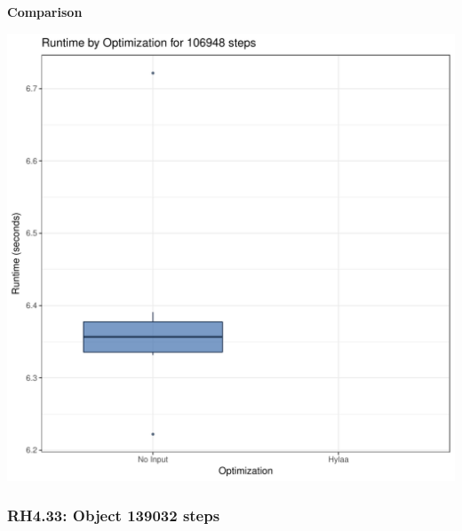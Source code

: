 \documentclass{article}\usepackage[]{graphicx}\usepackage[]{color}
\makeatletter
\def\maxwidth{ %
  \ifdim\Gin@nat@width>\linewidth
    \linewidth
  \else
    \Gin@nat@width
  \fi
}
\newenvironment{knitrout}{}{} %
\makeatother
\begin{document}
 \textbf{Comparison}
  
\begin{knitrout}
\color{fgcolor}
\includegraphics[width=\maxwidth]{figure/RH4_steps106948-1} 

\end{knitrout}


\subsubsection{RH4.33: Object 139032 steps}
\end{document}
